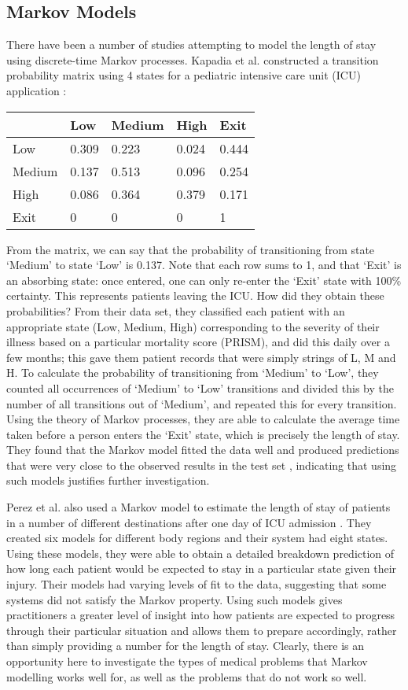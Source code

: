 \subsection{Markov Models}
There have been a number of studies attempting to model the length of stay
using discrete-time Markov processes. Kapadia et al. constructed a transition
probability matrix using 4 states for a pediatric intensive care unit (ICU)
application \citep{Kapadia2000}:
\begin{center}
\begin{tabular}{l|llll}
& Low & Medium & High & Exit \\
\hline
Low & 0.309 & 0.223 & 0.024 & 0.444 \\
Medium & 0.137 & 0.513 & 0.096 & 0.254 \\
High & 0.086 & 0.364 & 0.379 & 0.171 \\
Exit & 0 & 0 & 0 & 1 \\
\end{tabular}
\end{center}
From the matrix, we can say that the probability of transitioning from state
`Medium' to state `Low' is 0.137. Note that each row sums to 1, and that `Exit'
is an absorbing state: once entered, one can only re-enter the `Exit' state
with 100\% certainty. This represents patients leaving the ICU. How did they
obtain these probabilities? From their data set, they classified each patient
with an appropriate state (Low, Medium, High) corresponding to the severity of
their illness based on a particular mortality score (PRISM), and did this daily
over a few months; this gave them patient records that were simply strings of
L, M and H. To calculate the probability of transitioning from `Medium' to
`Low', they counted all occurrences of `Medium' to `Low' transitions and
divided this by the number of all transitions out of `Medium', and repeated
this for every transition. Using the theory of Markov processes, they are able
to calculate the average time taken before a person enters the `Exit' state,
which is precisely the length of stay. They found that the Markov model fitted
the data well and produced predictions that were very close to the observed
results in the test set \citep{Kapadia2000}, indicating that using such models
justifies further investigation.

Perez et al. also used a Markov model to estimate the length of stay of
patients in a number of different destinations after one day of ICU admission
 \citep{Perez2006}. They created six models for different body regions and their
system had eight states. Using these models, they were able to obtain a
detailed breakdown prediction of how long each patient would be expected to
stay in a particular state given their injury. Their models had varying levels
of fit to the data, suggesting that some systems did not satisfy the Markov
property. Using such models gives practitioners a greater level of insight
into how patients are expected to progress through their particular situation
and allows them to prepare accordingly, rather than simply providing a number
for the length of stay. Clearly, there is an opportunity here to investigate
the types of medical problems that Markov modelling works well for, as well as
the problems that do not work so well.

